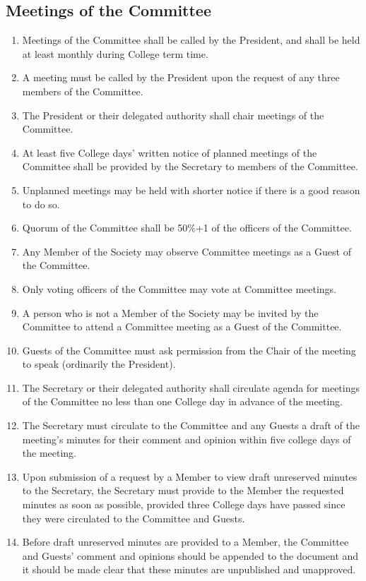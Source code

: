 \documentclass[a4paper]{tufte-handout}
\newcommand{\policyOffset}{12pt}
\newcommand{\policyBye}[2][\policyOffset]{\marginnote[#1]{\textsc{Bye-laws \S#2}}}
\begin{document}
\subsection{Meetings of the Committee}
\begin{enumerate}[resume]
    \item Meetings of the Committee shall be called by the President, and shall be held at least monthly during College term time.
    \item A meeting must be called by the President upon the request of any three members of the Committee.
    \item The President or their delegated authority shall chair meetings of the Committee.
    \item At least five College days' written notice of planned meetings of the Committee shall be provided by the Secretary to members of the Committee.
    \item Unplanned meetings may be held with shorter notice if there is a good reason to do so.
        \item \policyBye{B11} Quorum of the Committee shall be 50\%+1 of the officers of the Committee.
	\item Any Member of the Society may observe Committee meetings as a Guest of the Committee.
    \item Only voting officers of the Committee may vote at Committee meetings.
    \item A person who is not a Member of the Society may be invited by the Committee to attend a Committee meeting as a Guest of the Committee.
    \item Guests of the Committee must ask permission from the Chair of the meeting to speak (ordinarily the President).
    \item The Secretary or their delegated authority shall circulate agenda for meetings of the Committee no less than one College day in advance of the meeting.
    \item The Secretary must circulate to the Committee and any Guests a draft of the meeting's minutes for their comment and opinion within five college days of the meeting.
    \item Upon submission of a request by a Member to view draft unreserved minutes to the Secretary, the Secretary must provide to the Member the requested minutes as soon as possible, provided three College days have passed since they were circulated to the Committee and Guests.
    \item Before draft unreserved minutes are provided to a Member, the Committee and Guests' comment and opinions should be appended to the document and it should be made clear that these minutes are unpublished and unapproved.

\end{enumerate}
\end{document}
